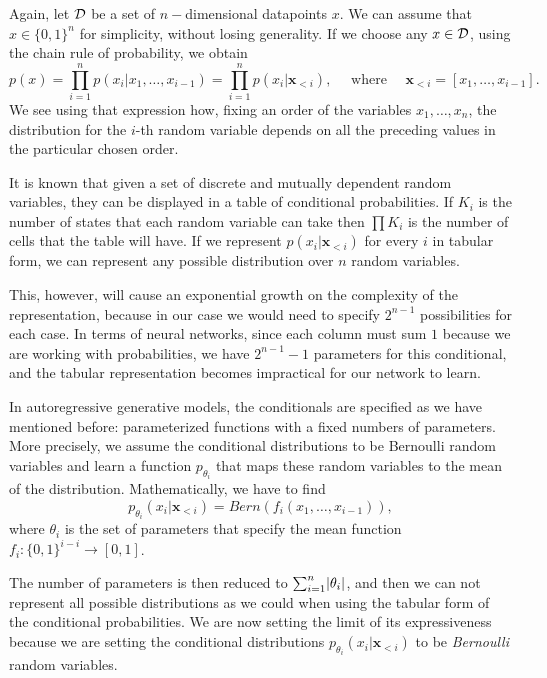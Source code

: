 Again, let $\mathcal{D}$ be a set of $n-$dimensional datapoints $x$. We can assume that $x \in \{0,1\}^n$ for simplicity, without losing generality. If we choose any $x\in \mathcal{D}$, using the chain rule of probability, we obtain
$$
p(x) = \prod_{i=1} ^n p(x_i | x_1,\dots,x_{i-1}) = \prod_{i = 1}^n p(x_i|\bm{x}_{<i}), \quad  \text{ where }  \quad \bm{x}_{<i} = [x_1,\dots, x_{i-1}].
$$
We see using that expression how, fixing an order of the variables $x_1,\dots,x_n$, the distribution for the $i$-th random variable depends on all the preceding values in the particular chosen order. 

It is known that given a set of discrete and mutually dependent random variables, they can be displayed in a table of conditional probabilities. If $K_i$ is the number of states that each random variable can take
then $\prod K_i$ is the number of cells that the table will have. If we represent $p(x_i|\bm{x}_{<i})$ for every $i$ in tabular form, we can represent
any possible distribution over $n$ random variables. 

This, however, will cause an exponential growth on the complexity of the representation, because in our case we would need to specify $2^{n-1}$ possibilities 
for each case. In terms of neural networks, since each column must sum $1$ because we are working with probabilities, we have $2^{n-1}-1$ parameters for this conditional, and the tabular representation
becomes impractical for our network to learn.

In autoregressive generative models, the conditionals are specified as we have mentioned before: parameterized functions with a fixed numbers of parameters. More precisely,  we assume 
the conditional distributions to be Bernoulli random variables and learn a function $p_{\theta_i}$ that maps these random variables to the mean of the distribution. Mathematically, we have to find 
$$
p_{\theta_i}(x_i | \bm{x}_{<i}) = Bern(f_i(x_1,\dots,x_{i-1})),
$$
where $\theta_i$ is the set of parameters that specify the mean function $f_i:\{0,1\}^{i-i} \to [0,1]$.

The number of parameters is then reduced to $\sum_{i=1}^n \lvert\theta_i\rvert$, and then we can not represent all possible distributions as we could when using the tabular form of the conditional probabilities.
We are now setting the limit of its expressiveness because we are setting the conditional distributions $p_{\theta_i}(x_i|\bm{x}_{<i})$ to be \emph{Bernoulli} random variables. 

